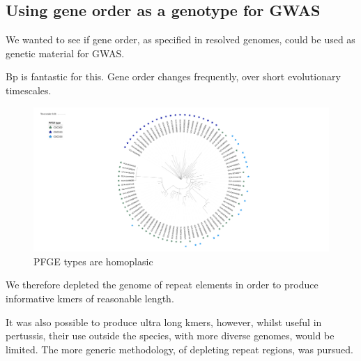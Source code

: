 \documentclass{article}
\begin{document}



\subsection{Using gene order as a genotype for GWAS}

We wanted to see if gene order, as specified in resolved genomes, could be used as genetic material for GWAS.

Bp is fantastic for this. Gene order changes frequently, over short evolutionary timescales.

\begin{figure}[h!]
\centering
\includegraphics[width=\textwidth{}]{PFGE_tree.png}
\caption{PFGE types are homoplasic}
\label{fig:PFGE_tree}
\end{figure}

We therefore depleted the genome of repeat elements in order to produce informative kmers of reasonable length.

It was also possible to produce ultra long kmers, however, whilst useful in pertussis, their use outside the species, with more diverse genomes, would be limited. The more generic methodology, of depleting repeat regions, was pursued.
\end{document}
